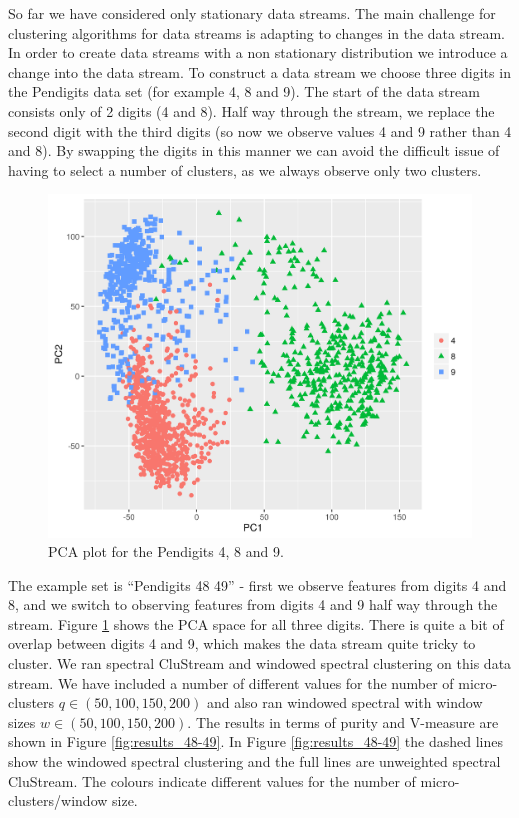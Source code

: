 So far we have considered only stationary data streams. The main challenge for clustering algorithms for data streams is adapting to changes in the data stream. In order to create data streams with a non stationary distribution we introduce a change into the data stream. To construct a data stream we choose three digits in the Pendigits data set (for example 4, 8 and 9). The start of the data stream consists only of 2 digits (4 and 8). Half way through the stream, we replace  the second digit with the third digits (so now we observe values 4 and 9 rather than 4 and 8). By swapping the digits in this manner we can avoid the difficult issue of having to select a number of clusters, as we always observe only two clusters.

\begin{figure}[h]
  \centering
 \includegraphics[width=.5\linewidth]{evolving_pen/evolving_pen_48_49_truth.png}  
\caption{PCA plot for the Pendigits 4, 8 and 9.}
\label{fig:48_49_pca}
\end{figure}

The example set is ``Pendigits 48 49'' - first we observe features from digits 4 and 8, and we switch to observing features from digits 4 and 9 half way through the stream. Figure \ref{fig:48_49_pca} shows the PCA space for all  three digits. There is quite a bit of overlap between digits 4 and 9, which makes the data stream quite tricky to cluster. We ran spectral CluStream and windowed spectral clustering on this  data stream. We have included a number of different values for the number of micro-clusters  $q \in (50, 100, 150, 200)$ and also ran windowed spectral with window sizes $w \in( 50,100,150, 200)$. The results in terms of purity and V-measure are shown in Figure \ref{fig:results_48-49}. 
In Figure \ref{fig:results_48-49} the dashed lines show the windowed spectral clustering and the full lines are unweighted spectral CluStream. The colours indicate different values for the number of micro-clusters/window size. 

